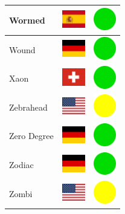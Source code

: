 \documentclass[12pt, a4paper, twoside]{report}
\begin{document}
\begin{center}
\begin{longtable}{|p{5cm}|p{2cm}|p{2cm}|}
Wormed & \includegraphics[width=1cm]{4x3/es} & \includegraphics[width=1cm]{likes/y} \\ \hline
Wound & \includegraphics[width=1cm]{4x3/de} & \includegraphics[width=1cm]{likes/y} \\ \hline
Xaon & \includegraphics[width=1cm]{4x3/ch} & \includegraphics[width=1cm]{likes/y} \\ \hline
Zebrahead & \includegraphics[width=1cm]{4x3/us} & \includegraphics[width=1cm]{likes/m} \\ \hline
Zero Degree & \includegraphics[width=1cm]{4x3/de} & \includegraphics[width=1cm]{likes/y} \\ \hline
Zodiac & \includegraphics[width=1cm]{4x3/de} & \includegraphics[width=1cm]{likes/y} \\ \hline
Zombi & \includegraphics[width=1cm]{4x3/us} & \includegraphics[width=1cm]{likes/m} \\ \hline
		\end{longtable}
	\end{center}
\end{document}

